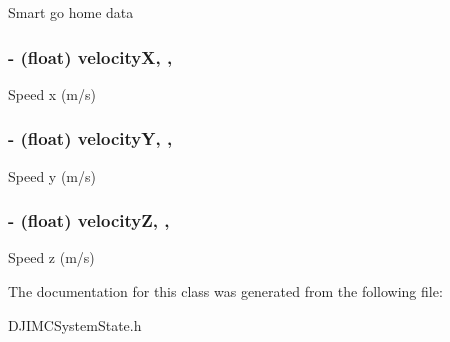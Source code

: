 Smart go home data \hypertarget{interface_d_j_i_m_c_system_state_a325798d4e0c80ec568fdf36ce1098901}{
\subsubsection[{velocity\+X}]{\setlength{\rightskip}{0pt plus 5cm}-\/ (float) velocity\+X\hspace{0.3cm}{\ttfamily [read]}, {\ttfamily [nonatomic]}, {\ttfamily [assign]}}}\label{interface_d_j_i_m_c_system_state_a325798d4e0c80ec568fdf36ce1098901}
Speed x (m/s) \hypertarget{interface_d_j_i_m_c_system_state_aa41385209d9edaef3f4d6ee6385b471b}{
\subsubsection[{velocity\+Y}]{\setlength{\rightskip}{0pt plus 5cm}-\/ (float) velocity\+Y\hspace{0.3cm}{\ttfamily [read]}, {\ttfamily [nonatomic]}, {\ttfamily [assign]}}}\label{interface_d_j_i_m_c_system_state_aa41385209d9edaef3f4d6ee6385b471b}
Speed y (m/s) \hypertarget{interface_d_j_i_m_c_system_state_ab2bee010d83187db9a3ded5456494e8a}{
\subsubsection[{velocity\+Z}]{\setlength{\rightskip}{0pt plus 5cm}-\/ (float) velocity\+Z\hspace{0.3cm}{\ttfamily [read]}, {\ttfamily [nonatomic]}, {\ttfamily [assign]}}}\label{interface_d_j_i_m_c_system_state_ab2bee010d83187db9a3ded5456494e8a}
Speed z (m/s) 

The documentation for this class was generated from the following file\+:\begin{DoxyCompactItemize}
\item 
D\+J\+I\+M\+C\+System\+State.\+h\end{DoxyCompactItemize}
